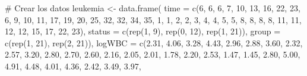 \documentclass[
]{article}
\newenvironment{Shaded}{\begin{snugshade}}{\end{snugshade}}
\newcommand{\AttributeTok}[1]{\textcolor[rgb]{0.40,0.45,0.13}{#1}}
\newcommand{\CommentTok}[1]{\textcolor[rgb]{0.37,0.37,0.37}{#1}}
\newcommand{\DecValTok}[1]{\textcolor[rgb]{0.68,0.00,0.00}{#1}}
\newcommand{\FloatTok}[1]{\textcolor[rgb]{0.68,0.00,0.00}{#1}}
\newcommand{\FunctionTok}[1]{\textcolor[rgb]{0.28,0.35,0.67}{#1}}
\newcommand{\NormalTok}[1]{\textcolor[rgb]{0.00,0.23,0.31}{#1}}
\newcommand{\OtherTok}[1]{\textcolor[rgb]{0.00,0.23,0.31}{#1}}
\begin{document}
\begin{tcolorbox}[enhanced jigsaw, opacityback=0, bottomrule=.15mm, leftrule=.75mm, rightrule=.15mm, arc=.35mm, toprule=.15mm, left=2mm, colframe=quarto-callout-note-color-frame, breakable, colback=white]
\begin{Shaded}
\begin{Highlighting}[]
\CommentTok{\# Crear los datos}
\NormalTok{leukemia }\OtherTok{\textless{}{-}} \FunctionTok{data.frame}\NormalTok{(}
  \AttributeTok{time =} \FunctionTok{c}\NormalTok{(}\DecValTok{6}\NormalTok{, }\DecValTok{6}\NormalTok{, }\DecValTok{6}\NormalTok{, }\DecValTok{7}\NormalTok{, }\DecValTok{10}\NormalTok{, }\DecValTok{13}\NormalTok{, }\DecValTok{16}\NormalTok{, }\DecValTok{22}\NormalTok{, }\DecValTok{23}\NormalTok{, }\DecValTok{6}\NormalTok{, }\DecValTok{9}\NormalTok{, }\DecValTok{10}\NormalTok{, }\DecValTok{11}\NormalTok{, }\DecValTok{17}\NormalTok{, }\DecValTok{19}\NormalTok{, }\DecValTok{20}\NormalTok{, }\DecValTok{25}\NormalTok{, }\DecValTok{32}\NormalTok{, }\DecValTok{32}\NormalTok{, }\DecValTok{34}\NormalTok{, }\DecValTok{35}\NormalTok{,}
           \DecValTok{1}\NormalTok{, }\DecValTok{1}\NormalTok{, }\DecValTok{2}\NormalTok{, }\DecValTok{2}\NormalTok{, }\DecValTok{3}\NormalTok{, }\DecValTok{4}\NormalTok{, }\DecValTok{4}\NormalTok{, }\DecValTok{5}\NormalTok{, }\DecValTok{5}\NormalTok{, }\DecValTok{8}\NormalTok{, }\DecValTok{8}\NormalTok{, }\DecValTok{8}\NormalTok{, }\DecValTok{8}\NormalTok{, }\DecValTok{11}\NormalTok{, }\DecValTok{11}\NormalTok{, }\DecValTok{12}\NormalTok{, }\DecValTok{12}\NormalTok{, }\DecValTok{15}\NormalTok{, }\DecValTok{17}\NormalTok{, }\DecValTok{22}\NormalTok{, }\DecValTok{23}\NormalTok{),}
  \AttributeTok{status =} \FunctionTok{c}\NormalTok{(}\FunctionTok{rep}\NormalTok{(}\DecValTok{1}\NormalTok{, }\DecValTok{9}\NormalTok{), }\FunctionTok{rep}\NormalTok{(}\DecValTok{0}\NormalTok{, }\DecValTok{12}\NormalTok{), }\FunctionTok{rep}\NormalTok{(}\DecValTok{1}\NormalTok{, }\DecValTok{21}\NormalTok{)),}
  \AttributeTok{group =} \FunctionTok{c}\NormalTok{(}\FunctionTok{rep}\NormalTok{(}\DecValTok{1}\NormalTok{, }\DecValTok{21}\NormalTok{), }\FunctionTok{rep}\NormalTok{(}\DecValTok{2}\NormalTok{, }\DecValTok{21}\NormalTok{)),}
  \AttributeTok{logWBC =} \FunctionTok{c}\NormalTok{(}\FloatTok{2.31}\NormalTok{, }\FloatTok{4.06}\NormalTok{, }\FloatTok{3.28}\NormalTok{, }\FloatTok{4.43}\NormalTok{, }\FloatTok{2.96}\NormalTok{, }\FloatTok{2.88}\NormalTok{, }\FloatTok{3.60}\NormalTok{, }\FloatTok{2.32}\NormalTok{, }\FloatTok{2.57}\NormalTok{, }
             \FloatTok{3.20}\NormalTok{, }\FloatTok{2.80}\NormalTok{, }\FloatTok{2.70}\NormalTok{, }\FloatTok{2.60}\NormalTok{, }\FloatTok{2.16}\NormalTok{, }\FloatTok{2.05}\NormalTok{, }\FloatTok{2.01}\NormalTok{, }\FloatTok{1.78}\NormalTok{, }\FloatTok{2.20}\NormalTok{, }\FloatTok{2.53}\NormalTok{, }\FloatTok{1.47}\NormalTok{, }\FloatTok{1.45}\NormalTok{,}
             \FloatTok{2.80}\NormalTok{, }\FloatTok{5.00}\NormalTok{, }\FloatTok{4.91}\NormalTok{, }\FloatTok{4.48}\NormalTok{, }\FloatTok{4.01}\NormalTok{, }\FloatTok{4.36}\NormalTok{, }\FloatTok{2.42}\NormalTok{, }\FloatTok{3.49}\NormalTok{, }\FloatTok{3.97}\NormalTok{, }

\end{Highlighting}
\end{Shaded}
\end{tcolorbox}
\end{document}
